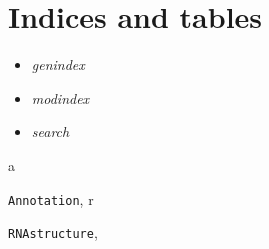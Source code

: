 \documentclass[letterpaper,10pt,english]{sphinxmanual}
\begin{document}
\chapter{Indices and tables}
\label{index:indices-and-tables}\begin{itemize}
\item {} 
\emph{genindex}

\item {} 
\emph{modindex}

\item {} 
\emph{search}

\end{itemize}


\renewcommand{\indexname}{Python Module Index}
\begin{theindex}
\def\bigletter#1{{\Large\sffamily#1}\nopagebreak\vspace{1mm}}
\bigletter{a}
\item {\texttt{Annotation}}, \pageref{Other_api:module-Annotation}
\indexspace
\bigletter{r}
\item {\texttt{RNAstructure}}, \pageref{Other_api:module-RNAstructure}
\end{theindex}

\renewcommand{\indexname}{Index}
\printindex
\end{document}

